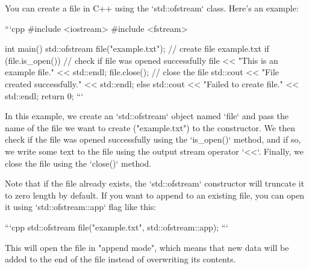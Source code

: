 You can create a file in C++ using the `std::ofstream` class. Here's an example:

```cpp
#include <iostream>
#include <fstream>

int main() {
    std::ofstream file("example.txt"); // create file example.txt
    if (file.is_open()) { // check if file was opened successfully
        file << "This is an example file." << std::endl;
        file.close(); // close the file
        std::cout << "File created successfully." << std::endl;
    }
    else {
        std::cout << "Failed to create file." << std::endl;
    }
    return 0;
}
```

In this example, we create an `std::ofstream` object named `file` and pass the name of the file we want to create ("example.txt") to the constructor. We then check if the file was opened successfully using the `is_open()` method, and if so, we write some text to the file using the output stream operator `<<`. Finally, we close the file using the `close()` method.

Note that if the file already exists, the `std::ofstream` constructor will truncate it to zero length by default. If you want to append to an existing file, you can open it using `std::ofstream::app` flag like this:

```cpp
std::ofstream file("example.txt", std::ofstream::app);
```

This will open the file in "append mode", which means that new data will be added to the end of the file instead of overwriting its contents.
